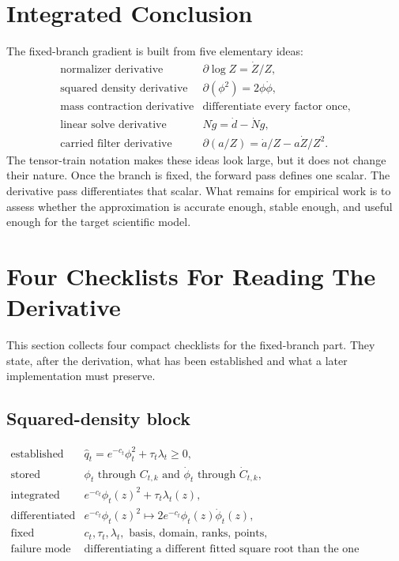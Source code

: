 \documentclass[11pt]{article}
\numberwithin{equation}{section}
\begin{document}
\section{Integrated Conclusion}

The fixed-branch gradient is built from five elementary ideas:
\begin{equation}
\begin{array}{ll}
\text{normalizer derivative} & \partial\log Z=\dot Z/Z,\\[2mm]
\text{squared density derivative} & \partial(\phi^2)=2\phi\dot\phi,\\[2mm]
\text{mass contraction derivative} & \text{differentiate every factor once},\\[2mm]
\text{linear solve derivative} & N\dot g=\dot d-\dot N g,\\[2mm]
\text{carried filter derivative} & \partial(a/Z)=\dot a/Z-a\dot Z/Z^2.
\end{array}
\label{eq:p24-p19-110}
\end{equation}
The tensor-train notation makes these ideas look large, but it does not change
their nature.  Once the branch is fixed, the forward pass defines one scalar.
The derivative pass differentiates that scalar.  What remains for empirical
work is to assess whether the approximation is accurate enough, stable enough,
and useful enough for the target scientific model.

\section{Four Checklists For Reading The Derivative}

This section collects four compact checklists for the fixed-branch part.  They
state, after the derivation, what has been established and what a later
implementation must preserve.

\subsection*{Squared-density block}

\begin{equation}
\begin{array}{ll}
\text{established} &
    \widehat q_t=e^{-c_t}\phi_t^2+\tau_t\lambda_t\ge0,\\[1mm]
\text{stored} &
    \phi_t \text{ through } C_{t,k}
    \text{ and } \dot\phi_t \text{ through } \dot C_{t,k},\\[1mm]
\text{integrated} &
    e^{-c_t}\phi_t(z)^2+\tau_t\lambda_t(z),\\[1mm]
\text{differentiated} &
    e^{-c_t}\phi_t(z)^2
    \mapsto 2e^{-c_t}\phi_t(z)\dot\phi_t(z),\\[1mm]
\text{fixed} &
    c_t,\tau_t,\lambda_t,\text{ basis, domain, ranks, points},\\[1mm]
\text{failure mode} &
    \text{differentiating a different fitted square root than the one squared.}
\end{array}
\label{eq:p24-p22-r1}
\end{equation}
\end{document}
